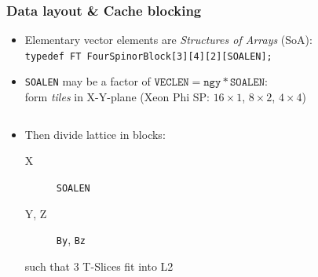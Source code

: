 \documentclass{beamer}
\begin{document}
  \begin{frame}
    \frametitle{Data layout \& Cache blocking}

    \begin{itemize}
      \item Elementary vector elements are \textit{Structures of Arrays} (SoA):\\
        \texttt{typedef FT FourSpinorBlock[3][4][2][SOALEN];}
        \vfill

      \item \texttt{SOALEN} may be a factor of $\texttt{VECLEN} = \texttt{ngy} * \texttt{SOALEN}$:\\
        form \textit{tiles} in X-Y-plane (Xeon Phi SP: $16\times1$, $8\times2$, $4\times4$)
    \end{itemize}

    \begin{columns}

      \begin{column}{.5\textwidth}
        \begin{center}
          \begin{itemize}
            \item Then divide lattice in blocks:
              \begin{description}
                \item[X]    \texttt{SOALEN}\\
                \item[Y, Z] \texttt{By}, \texttt{Bz}\\[2mm]
              \end{description}
              such that 3 T-Slices fit into L2
              \vfill
          \end{itemize}
        \end{center}
      \end{column}

      \begin{column}{.5\textwidth}
        \begin{center}
\end{center}
\end{column}
\end{columns}
\end{frame}
\end{document}
